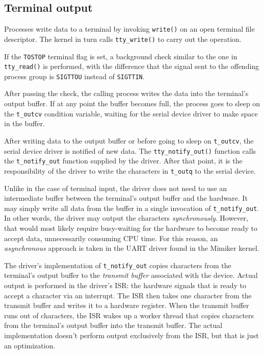 \documentclass[shortabstract, manyadvisors, english, mgr]{iithesis}
\begin{document}
\subsection{Terminal output}

Processes write data to a terminal by invoking \texttt{write()} on an open
terminal file descriptor. The kernel in turn calls \texttt{tty\_write()} to
carry out the operation.

If the \texttt{TOSTOP} terminal flag is set, a background check similar to the
one in \texttt{tty\_read()} is performed, with the difference that the signal
sent to the offending process group is \texttt{SIGTTOU} instead of
\texttt{SIGTTIN}.

After passing the check, the calling process writes the data into the terminal's
output buffer. If at any point the buffer becomes full, the process goes to
sleep on the \texttt{t\_outcv} condition variable, waiting for the serial device
driver to make space in the buffer.

After writing data to the output buffer or before going to sleep on
\texttt{t\_outcv}, the serial device driver is notified of new data. The
\texttt{tty\_notify\_out()} function calls the \texttt{t\_notify\_out} function
supplied by the driver. After that point, it is the responsibility of the driver
to write the characters in \texttt{t\_outq} to the serial device.

Unlike in the case of terminal input, the driver does not need to use an
intermediate buffer between the terminal's output buffer and the hardware. It
may simply write all data from the buffer in a single invocation of
\texttt{t\_notify\_out}. In other words, the driver may output the characters
\textit{synchronously}. However, that would most likely require busy-waiting for
the hardware to become ready to accept data, unnecessarily consuming CPU time.
For this reason, an \textit{asynchronous} approach is taken in the UART driver
found in the Mimiker kernel.

The driver's implementation of \texttt{t\_notify\_out} copies characters from
the terminal's output buffer to the \textit{transmit buffer} associated with the
device. Actual output is performed in the driver's ISR: the hardware signals
that is ready to accept a character via an interrupt. The ISR then takes one
character from the transmit buffer and writes it to a hardware register. When
the transmit buffer runs out of characters, the ISR wakes up a worker thread
that copies characters from the terminal's output buffer into the transmit
buffer. The actual implementation doesn't perform output exclusively from the
ISR, but that is just an optimization.
\end{document}
